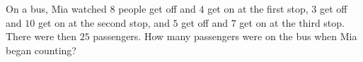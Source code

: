 On a bus, Mia watched $8$ people get off and $4$ get on at the first stop, $3$ get off and $10$ get on at the second stop, and $5$ get off and $7$ get on at the third stop. There were then $25$ passengers. How many passengers were on the bus when Mia began counting?
